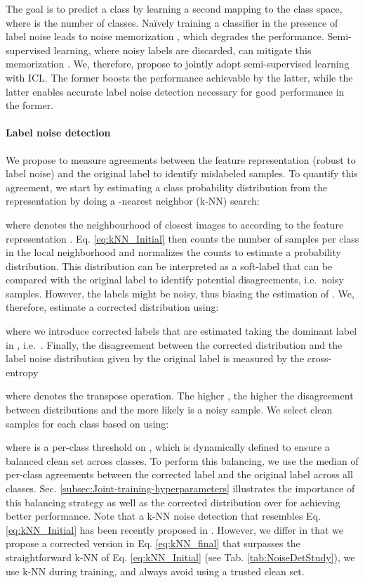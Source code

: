 \documentclass[final]{cvpr}
\begin{document}
The goal is to predict a class  by learning a second mapping  to the class space, where  is the number of classes. Na\"ively training a classifier in the presence of label noise leads to noise memorization \cite{2017_ICML_Memorization,2017_ICLR_Rethinking}, which degrades the performance.
Semi-supervised learning, where noisy labels are discarded, can mitigate this memorization \cite{2018_WACV_SemiSupNoise,2020_ICLR_DivideMix,2020_ICPR_SSLnoise}. We, therefore, propose to jointly adopt semi-supervised learning with ICL. The former boosts the performance achievable by the latter, while the latter enables accurate label noise detection necessary for good performance in the former.


\paragraph*{Label noise detection }

We propose to measure agreements between the feature representation  (robust to label noise) and the original label  to identify mislabeled samples. To quantify this agreement, we start by estimating a class probability distribution from the representation  by doing a -nearest neighbor (k-NN) search:

where  denotes the neighbourhood of  closest images to  according to the feature representation . Eq. \ref{eq:kNN_Initial} then counts the number of samples per class in the local neighborhood  and normalizes the counts to estimate a probability distribution. This distribution can be interpreted as a soft-label that can be compared with the original label to identify potential disagreements, i.e.~noisy samples. However, the labels  might be noisy, thus biasing the estimation of . We, therefore, estimate a corrected distribution  using:

where we introduce corrected labels  that are estimated taking the dominant label in , i.e.~. Finally, the disagreement between the corrected distribution  and the label noise distribution given by the original label  is measured by the cross-entropy

where  denotes the transpose operation. The higher , the higher the disagreement between distributions and the more likely  is a noisy sample. We select clean samples for each class  based on  using: 

where  is a per-class threshold on , which is dynamically
defined to ensure a balanced clean set across classes. To perform this balancing, we use the median of per-class agreements between the corrected label  and the original label  across all classes. Sec. \ref{subsec:Joint-training-hyperparameters} illustrates the importance of this balancing strategy as well as the corrected distribution  over  for achieving better performance. Note that a k-NN noise detection that resembles Eq. \ref{eq:kNN_Initial} has been recently proposed in \cite{2020_ICML_DeepKNN}. However, we differ in that we propose a corrected version in Eq. \ref{eq:kNN_final} that surpasses the straightforward k-NN of Eq. \ref{eq:kNN_Initial} (see Tab. \ref{tab:NoiseDetStudy}), we use k-NN during training, and always avoid using a trusted clean set.
\end{document}
